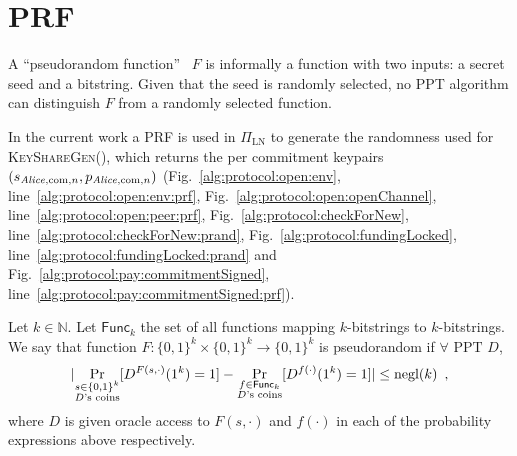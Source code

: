 \section{PRF}
  A ``pseudorandom function''~\cite{katzlindell} $F$ is informally a function
  with two inputs: a secret seed and a bitstring. Given that the seed is
  randomly selected, no PPT algorithm can distinguish $F$ from a randomly
  selected function.

  In the current work a PRF is used in $\Pi_{\mathrm{LN}}$ to generate the
  randomness used for \textsc{KeyShareGen}(), which returns the per commitment
  keypairs $(s_{\mathit{Alice}, \mathrm{com}, n}, p_{\mathit{Alice}, \mathrm{com}, n})$
  (Fig.~\ref{alg:protocol:open:env}, line~\ref{alg:protocol:open:env:prf},
  Fig.~\ref{alg:protocol:open:openChannel},
  line~\ref{alg:protocol:open:peer:prf}, Fig.~\ref{alg:protocol:checkForNew},
  line~\ref{alg:protocol:checkForNew:prand},
  Fig.~\ref{alg:protocol:fundingLocked},
  line~\ref{alg:protocol:fundingLocked:prand} and
  Fig.~\ref{alg:protocol:pay:commitmentSigned},
  line~\ref{alg:protocol:pay:commitmentSigned:prf}).

  \begin{definition}
    Let $k \in \mathbb{N}$. Let $\mathsf{Func}_k$ the set of all functions
    mapping $k$-bitstrings to $k$-bitstrings. We say that function $F: \{0,
    1\}^k \times \{0, 1\}^k \rightarrow \{0, 1\}^k$ is pseudorandom if $\forall
    \text{ PPT } D$,
    \begin{equation*}
      |\underset{\substack{s \in \{0, 1\}^k \\ D\text{'s
      coins}}}{\Pr}[D^{F(s, \cdot)}(1^k) = 1] - \underset{\substack{f \in
      \mathsf{Func}_k \\ D\text{'s coins}}}{\Pr}[D^{f(\cdot)}(1^k) = 1]|
      \leq \text{negl}(k) \enspace,
    \end{equation*}
    where $D$ is given oracle access to $F(s, \cdot)$ and $f(\cdot)$ in each of
    the probability expressions above respectively.
  \end{definition}
